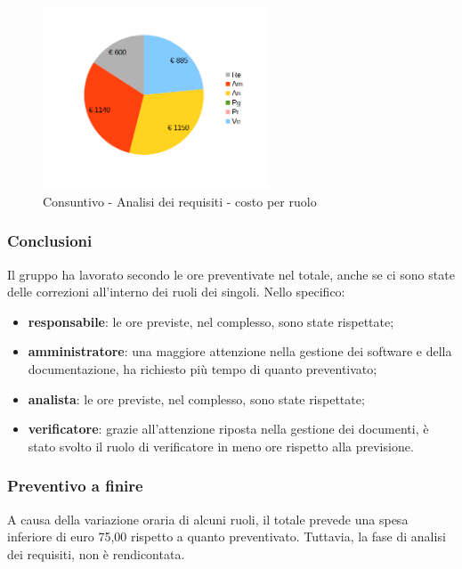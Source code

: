 \begin{figure} [h!]
	\centering
	\includegraphics[width=0.6\textwidth]{res/img/grafici/consuntivo- torta_ costo_per_ora- analisi dei requisiti.png}
	\caption{Consuntivo - Analisi dei requisiti - costo per ruolo} 
\end{figure}

\newpage 

\subsubsection{Conclusioni}
Il gruppo ha lavorato secondo le ore preventivate nel totale, anche se ci sono state delle correzioni all'interno dei ruoli dei singoli.
Nello specifico:
\begin{itemize}
	\item {\bfseries responsabile}: le ore previste, nel complesso, sono state rispettate;
	\item {\bfseries amministratore}: una maggiore attenzione nella gestione dei software e della documentazione, ha richiesto più tempo di quanto preventivato;
	\item {\bfseries analista}: le ore previste, nel complesso, sono state rispettate;
	\item {\bfseries verificatore}: grazie all'attenzione riposta nella gestione dei documenti, è stato svolto il ruolo di verificatore in meno ore rispetto alla previsione.\\
	
\end{itemize}

	\subsubsection{Preventivo a finire}
	A causa della variazione oraria di alcuni ruoli, il totale prevede una spesa inferiore di euro 75,00 rispetto a quanto preventivato.
	Tuttavia, la fase di analisi dei requisiti, non è rendicontata.
